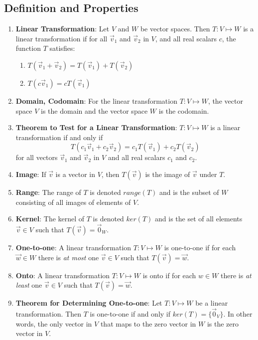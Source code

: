 \documentclass[10pt]{article}
\begin{document}
\subsection{Definition and Properties}
\begin{enumerate}
\item \textbf{Linear Transformation}: Let $V$ and $W$ be vector spaces. Then $T: V \mapsto W$ is a linear transformation if for all $\vec{v}_1$ and $\vec{v}_2$ in $V$, and all real scalars $c$, the function $T$ satisfies: 
\begin{enumerate}
\item $T(\vec{v}_1 + \vec{v}_2) = T(\vec{v}_1) + T(\vec{v}_2)$
\item $T(c \vec{v}_1) = cT(\vec{v}_1)$
\end{enumerate}
\item \textbf{Domain, Codomain}: For the linear transformation $T: V \mapsto W$, the vector space $V$ is the domain and the vector space $W$ is the  codomain.
\item \textbf{Theorem to Test for a Linear Transformation}: $T: V \mapsto W$ is a linear transformation if and only if $$T(c_1 \vec{v}_1 + c_2 \vec{v}_2) = c_1 T(\vec{v}_1) + c_2 T(\vec{v}_2)$$ for all vectors $\vec{v}_1$ and $\vec{v}_2$ in $V$ and all real scalars $c_1$ and $c_2$.
\item \textbf{Image}: If $\vec{v}$ is a vector in $V$, then $T(\vec{v})$ is the image of $\vec{v}$ under $T$.
\item \textbf{Range}: The range of $T$ is denoted $range(T)$ and is the subset of $W$ consisting of all images of elements of $V$.
\item \textbf{Kernel}: The kernel of $T$ is denoted $ker(T)$ and is the set of all elements $\vec{v} \in V$ such that $T(\vec{v}) = \vec{0}_W$.
\item \textbf{One-to-one}: A linear transformation $T: V \mapsto W$ is one-to-one if for each $\vec{w} \in W$ there is \textit{at most} one $\vec{v} \in V$ such that $T(\vec{v}) = \vec{w}$.
\item \textbf{Onto}: A linear transformation $T: V \mapsto W$ is onto if for each $w \in W$ there is \textit{at least} one $\vec{v} \in V$ such that $T(\vec{v}) = \vec{w}$.
\item \textbf{Theorem for Determining One-to-one}: Let $T: V \mapsto W$ be a linear transformation. Then $T$ is one-to-one if and only if $ker(T) = \lbrace \vec{0}_V \rbrace$. In other words, the only vector in $V$ that maps to the zero vector in $W$ is the zero vector in $V$.

\end{enumerate}
\end{document}
